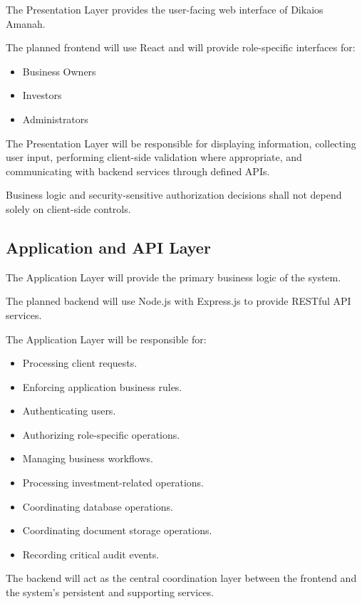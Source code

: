 The Presentation Layer provides the user-facing web interface of
Dikaios Amanah.

The planned frontend will use React and will provide role-specific
interfaces for:

\begin{itemize}
    \item Business Owners
    \item Investors
    \item Administrators
\end{itemize}

The Presentation Layer will be responsible for displaying information,
collecting user input, performing client-side validation where appropriate,
and communicating with backend services through defined APIs.

Business logic and security-sensitive authorization decisions shall not
depend solely on client-side controls.


\subsection{Application and API Layer}

The Application Layer will provide the primary business logic of the
system.

The planned backend will use Node.js with Express.js to provide RESTful
API services.

The Application Layer will be responsible for:

\begin{itemize}
    \item Processing client requests.
    \item Enforcing application business rules.
    \item Authenticating users.
    \item Authorizing role-specific operations.
    \item Managing business workflows.
    \item Processing investment-related operations.
    \item Coordinating database operations.
    \item Coordinating document storage operations.
    \item Recording critical audit events.
\end{itemize}

The backend will act as the central coordination layer between the
frontend and the system's persistent and supporting services.


